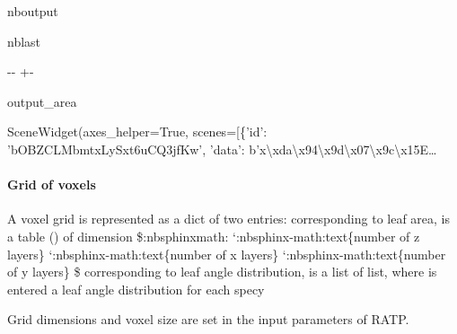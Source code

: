 \documentclass[letterpaper,10pt,english]{sphinxmanual}
\begin{document}
\begin{sphinxuseclass}{nboutput}
\begin{sphinxuseclass}{nblast}
{

\kern-\sphinxverbatimsmallskipamount\kern-\baselineskip
\kern+\FrameHeightAdjust\kern-\fboxrule
\vspace{\nbsphinxcodecellspacing}

\begin{sphinxuseclass}{output_area}
\begin{sphinxuseclass}{}


\begin{sphinxVerbatim}[commandchars=\\\{\}]
\llap{\color{nbsphinxout}[7]:\,\hspace{\fboxrule}\hspace{\fboxsep}}SceneWidget(axes\_helper=True, scenes=[\{'id': 'bOBZCLMbmtxLySxt6uCQ3jfKw', 'data': b'x\textbackslash{}xda\textbackslash{}x94\textbackslash{}x9d\textbackslash{}x07\textbackslash{}x9c\textbackslash{}x15E…
\end{sphinxVerbatim}



\end{sphinxuseclass}
\end{sphinxuseclass}
}

\end{sphinxuseclass}
\end{sphinxuseclass}

\paragraph{Grid of voxels}
\label{\detokenize{input_scenes:Grid-of-voxels}}
\sphinxAtStartPar
A voxel grid is represented as a dict of two entries: \sphinxhyphen{}  corresponding to leaf area, is a table () of dimension \$:nbsphinx\sphinxhyphen{}math: \times `:nbsphinx-math:text\{number of z layers\}\textasciigrave{} \times `:nbsphinx-math:text\{number of x layers\}\textasciigrave{} \times `:nbsphinx-math:text\{number of y layers\}\textasciigrave{} \$ \sphinxhyphen{}  corresponding to leaf angle distribution, is a list of list, where is entered a leaf angle distribution
for each specy

\sphinxAtStartPar
Grid dimensions and voxel size are set in the input parameters of RATP.
\end{document}
